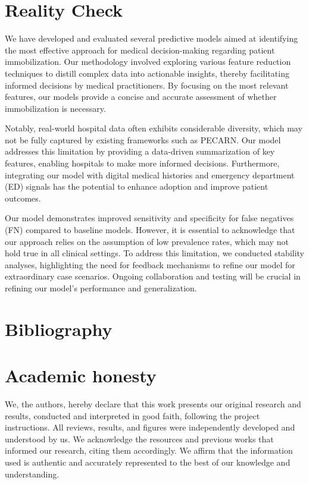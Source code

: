 \documentclass[10pt,letterpaper]{article}
\begin{document}
\section{Reality Check}

We have developed and evaluated several predictive models aimed at identifying the most effective approach for medical decision-making regarding patient immobilization. Our methodology involved exploring various feature reduction techniques to distill complex data into actionable insights, thereby facilitating informed decisions by medical practitioners. By focusing on the most relevant features, our models provide a concise and accurate assessment of whether immobilization is necessary.

Notably, real-world hospital data often exhibits considerable diversity, which may not be fully captured by existing frameworks such as PECARN. Our model addresses this limitation by providing a data-driven summarization of key features, enabling hospitals to make more informed decisions. Furthermore, integrating our model with digital medical histories and emergency department (ED) signals has the potential to enhance adoption and improve patient outcomes.

Our model demonstrates improved sensitivity and specificity for false negatives (FN) compared to baseline models. However, it is essential to acknowledge that our approach relies on the assumption of low prevalence rates, which may not hold true in all clinical settings. To address this limitation, we conducted stability analyses, highlighting the need for feedback mechanisms to refine our model for extraordinary case scenarios. Ongoing collaboration and testing will be crucial in refining our model's performance and generalization.

\newpage
\section{Bibliography}

 

\appendix
\section{Academic honesty}
We, the authors, hereby declare that this work presents our original research and results, conducted and interpreted in good faith, following the project instructions. All reviews, results, and figures were independently developed and understood by us. We acknowledge the resources and previous works that informed our research, citing them accordingly. We affirm that the information used is authentic and accurately represented to the best of our knowledge and understanding.
\end{document}
